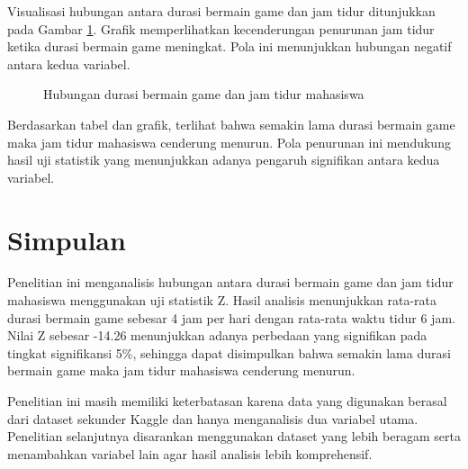\documentclass[metlit,article,accept,pdftex,moreauthors]{Definitions/mdpi}
\begin{document}
Visualisasi hubungan antara durasi bermain game dan jam tidur ditunjukkan pada Gambar \ref{fig:hasil}. Grafik memperlihatkan kecenderungan penurunan jam tidur ketika durasi bermain game meningkat. Pola ini menunjukkan hubungan negatif antara kedua variabel.

\begin{figure}[H]
\centering
{}
\caption{Hubungan durasi bermain game dan jam tidur mahasiswa}
\label{fig:hasil}
\end{figure}

Berdasarkan tabel dan grafik, terlihat bahwa semakin lama durasi bermain game maka jam tidur mahasiswa cenderung menurun. Pola penurunan ini mendukung hasil uji statistik yang menunjukkan adanya pengaruh signifikan antara kedua variabel.

\section{Simpulan}

Penelitian ini menganalisis hubungan antara durasi bermain game dan jam tidur mahasiswa menggunakan uji statistik Z. Hasil analisis menunjukkan rata-rata durasi bermain game sebesar 4 jam per hari dengan rata-rata waktu tidur 6 jam. Nilai Z sebesar -14.26 menunjukkan adanya perbedaan yang signifikan pada tingkat signifikansi 5\%, sehingga dapat disimpulkan bahwa semakin lama durasi bermain game maka jam tidur mahasiswa cenderung menurun.

Penelitian ini masih memiliki keterbatasan karena data yang digunakan berasal dari dataset sekunder Kaggle dan hanya menganalisis dua variabel utama. Penelitian selanjutnya disarankan menggunakan dataset yang lebih beragam serta menambahkan variabel lain agar hasil analisis lebih komprehensif.

\vspace{6pt} 

\end{document}
